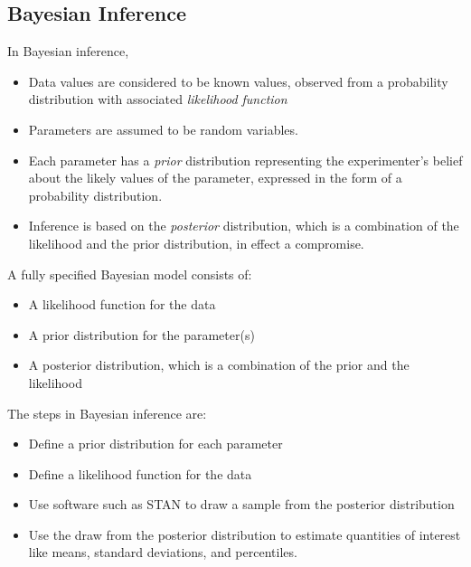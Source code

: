 \subsection{Bayesian Inference}
In Bayesian inference, 
\par\vspace{0.5 cm}
\begin{itemize}
\item Data values are considered to be known values, observed from a probability distribution with associated \textit{likelihood function}
\item Parameters are assumed to be random variables.
\item Each parameter has a \textit{prior} distribution representing the experimenter's belief about the likely values of the parameter, expressed in the form of a probability distribution.
\item Inference is based on the \textit{posterior} distribution, which is a combination of the likelihood and the prior distribution, in effect a compromise.
\end{itemize}
\par\vspace{0.5 cm}
A fully specified Bayesian model consists of:
\par\vspace{0.5 cm}
\begin{itemize}
\item A likelihood function for the data
\item A prior distribution for the parameter(s)
\item A posterior distribution, which is a combination of the prior and the likelihood
\end{itemize}
\par\vspace{0.5 cm}
The steps in Bayesian inference are:
\par\vspace{0.5 cm}
\begin{itemize}
\item Define a prior distribution for each parameter
\item Define a likelihood function for the data
\item Use software such as STAN to draw a sample from the posterior distribution
\item Use the draw from the posterior distribution to estimate quantities of interest like means, standard deviations, and percentiles.
\end{itemize}
